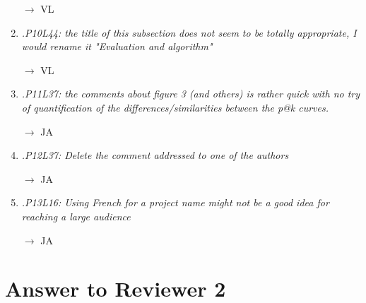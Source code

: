 \documentclass[10pt]{article}
\begin{document}
\begin{enumerate}
$\rightarrow$ VL

\item \emph{.P10L44: the title of this subsection does not seem to be totally appropriate, I would rename it "Evaluation and algorithm"}

$\rightarrow$ VL

\item \emph{.P11L37: the comments about figure 3 (and others) is rather quick with no try of quantification of the differences/similarities between the p@k curves.}

$\rightarrow$ JA

\item \emph{.P12L37: Delete the comment addressed to one of the authors}

$\rightarrow$ JA

\item \emph{.P13L16: Using French for a project name might not be a good idea for reaching a large audience}

$\rightarrow$ JA

\end{enumerate}

\section{Answer to Reviewer 2}
\end{document}
